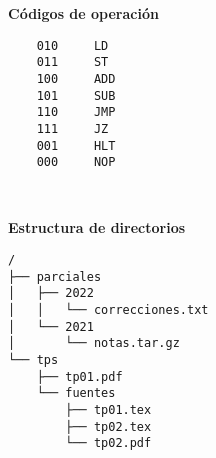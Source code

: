 \documentclass[12pt]{article}
\begin{document}
\begin{minipage}{0.45\textwidth}
\textbf{Códigos de operación}

\begin{verbatim}
    010     LD
    011     ST
    100     ADD
    101     SUB
    110     JMP
    111     JZ
    001     HLT
    000     NOP
\end{verbatim}
\end{minipage}
~
\begin{minipage}{0.45\textwidth}
\textbf{Estructura de directorios}

\begin{verbatim}
/
├── parciales
│   ├── 2022
│   │   └── correcciones.txt
│   └── 2021
│       └── notas.tar.gz
└── tps
    ├── tp01.pdf
    └── fuentes
        ├── tp01.tex
        ├── tp02.tex
        └── tp02.pdf
\end{verbatim}

\end{minipage}
\end{document}
